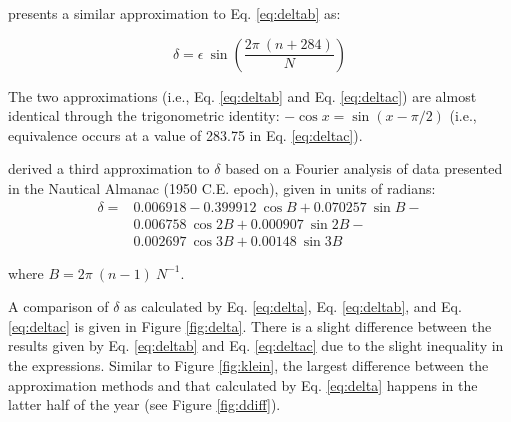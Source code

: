 \cite{cooper69} presents a similar approximation to Eq. \ref{eq:deltab} as:

\begin{equation}
\label{eq:deltac}
    \delta = \epsilon\:\sin\left(\frac{2\pi\:(n + 284)}{N} \right)
\end{equation}

The two approximations (i.e., Eq. \ref{eq:deltab} and Eq. \ref{eq:deltac}) are almost identical through the trigonometric identity: $-\cos x = \sin(x - \pi/2)$ (i.e., equivalence occurs at a value of 283.75 in Eq. \ref{eq:deltac}).

\cite{spencer71} derived a third approximation to $\delta$ based on a Fourier analysis of data presented in the Nautical Almanac (1950 C.E. epoch), given in units of radians:
\begin{equation}
\label{eq:spencer}
\begin{split}
	\delta = & 0.006918 - 0.399912\:\cos B + 0.070257\:\sin B - \\
             & 0.006758 \:\cos 2B + 0.000907\:\sin 2B - \\
             & 0.002697\:\cos 3B + 0.00148 \:\sin 3B
\end{split}
\end{equation} 

\noindent where $B = 2\pi\:\left(n-1\right)\: N^{-1}$.

A comparison of $\delta$ as calculated by Eq. \ref{eq:delta}, Eq. \ref{eq:deltab}, and Eq. \ref{eq:deltac} is given in Figure \ref{fig:delta}. 
There is a slight difference between the results given by Eq. \ref{eq:deltab} and Eq. \ref{eq:deltac} due to the slight inequality in the expressions. 
Similar to Figure \ref{fig:klein}, the largest difference between the approximation methods and that calculated by Eq. \ref{eq:delta} happens in the latter half of the year (see Figure \ref{fig:ddiff}).\\

